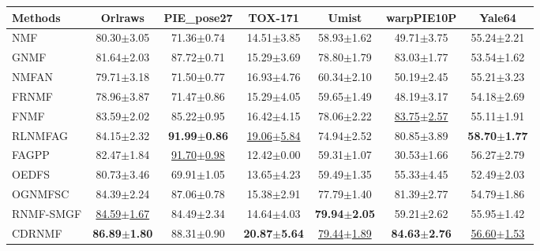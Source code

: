 \documentclass[a4paper,fleqn]{cas-sc}
\begin{document}
\begin{table}[htbp]
{\begin{tabular}{lcccccc}
		\textbf{Methods} & \textbf{Orlraws} & \textbf{PIE\_pose27} & \textbf{TOX-171} & \textbf{Umist} & \textbf{warpPIE10P} & \textbf{Yale64} \\
		\hline
		NMF & 80.30$\pm$3.05 & 71.36$\pm$0.74 & 14.51$\pm$3.85 & 58.93$\pm$1.62 & 49.71$\pm$3.75 & 55.24$\pm$2.21 \\
		GNMF & 81.64$\pm$2.03 & 87.72$\pm$0.71 & 15.29$\pm$3.69 & 78.80$\pm$1.79 & 83.03$\pm$1.77 & 53.54$\pm$1.62 \\
		NMFAN & 79.71$\pm$3.18 & 71.50$\pm$0.77 & 16.93$\pm$4.76 & 60.34$\pm$2.10 & 50.19$\pm$2.45 & 55.21$\pm$3.23 \\
		FRNMF & 78.96$\pm$3.87 & 71.47$\pm$0.86 & 15.29$\pm$4.05 & 59.65$\pm$1.49 & 48.19$\pm$3.17 & 54.18$\pm$2.69 \\
		FNMF & 83.59$\pm$2.02 & 85.22$\pm$0.95 & 16.42$\pm$4.15 & 78.06$\pm$2.22 & \underline{83.75$\pm$2.57} & 55.11$\pm$1.91 \\
		RLNMFAG & 84.15$\pm$2.32 & \textbf{91.99$\pm$0.86} & \underline{19.06$\pm$5.84} & 74.94$\pm$2.52 & 80.85$\pm$3.89 & \textbf{58.70$\pm$1.77} \\
		FAGPP & 82.47$\pm$1.84 & \underline{91.70$\pm$0.98} & 12.42$\pm$0.00 & 59.31$\pm$1.07 & 30.53$\pm$1.66 & 56.27$\pm$2.79 \\
		OEDFS & 80.73$\pm$3.46 & 69.91$\pm$1.05 & 13.65$\pm$4.23 & 59.49$\pm$1.35 & 55.33$\pm$4.45 & 52.49$\pm$2.03 \\
		OGNMFSC & 84.39$\pm$2.24 & 87.06$\pm$0.78 & 15.38$\pm$2.91 & 77.79$\pm$1.40 & 81.39$\pm$2.77 & 54.79$\pm$1.86 \\
		RNMF-SMGF & \underline{84.59$\pm$1.67} & 84.49$\pm$2.34 & 14.64$\pm$4.03 & \textbf{79.94$\pm$2.05} & 59.21$\pm$2.62 & 55.95$\pm$1.42 \\
		CDRNMF & \textbf{86.89$\pm$1.80} & 88.31$\pm$0.90 & \textbf{20.87$\pm$5.64} & \underline{79.44$\pm$1.89} & \textbf{84.63$\pm$2.76} & \underline{56.60$\pm$1.53} \\
		\hline
	\end{tabular}
}
	\label{tab:comparison1}
\end{table}
\end{document}
